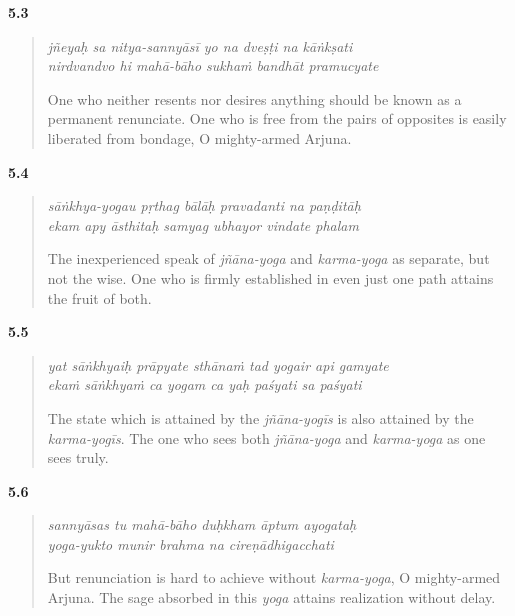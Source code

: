 \par\noindent\textbf{5.3}\par
\begin{verse}
\textit{jñeyaḥ sa nitya-sannyāsī yo na dveṣṭi na kāṅkṣati} \\
\textit{nirdvandvo hi mahā-bāho sukhaṁ bandhāt pramucyate}

\noindent One who neither resents nor desires anything should be known as a permanent renunciate. One who is free from the pairs of opposites is easily liberated from bondage, O mighty-armed Arjuna.
\end{verse}
\par



\par\noindent\textbf{5.4}\par
\begin{verse}
\textit{sāṅkhya-yogau pṛthag bālāḥ pravadanti na paṇḍitāḥ} \\
\textit{ekam apy āsthitaḥ samyag ubhayor vindate phalam}

\noindent The inexperienced speak of \textit{jñāna-yoga} and \textit{karma-yoga} as separate, but not the wise. One who is firmly established in even just one path attains the fruit of both.
\end{verse}
\par



\par\noindent\textbf{5.5}\par
\begin{verse}
\textit{yat sāṅkhyaiḥ prāpyate sthānaṁ tad yogair api gamyate} \\
\textit{ekaṁ sāṅkhyaṁ ca yogam ca yaḥ paśyati sa paśyati}

\noindent The state which is attained by the \textit{jñāna-yogīs} is also attained by the \textit{karma-yogīs}. The one who sees both \textit{jñāna-yoga} and \textit{karma-yoga} as one sees truly.
\end{verse}
\par



\par\noindent\textbf{5.6}\par
\begin{verse}
\textit{sannyāsas tu mahā-bāho duḥkham āptum ayogataḥ} \\
\textit{yoga-yukto munir brahma na cireṇādhigacchati}

\noindent But renunciation is hard to achieve without \textit{karma-yoga}, O mighty-armed Arjuna. The sage absorbed in this \textit{yoga} attains realization without delay.
\end{verse}
\par



